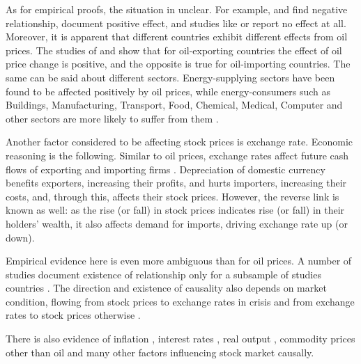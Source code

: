 \documentclass{elsarticle}
\begin{document}
As for empirical proofs, the situation in unclear.
For example, \citet{basher_oil_2012} and \citet{filis_macro_2010} find negative relationship, \citet{narayan_modelling_2010} document positive effect, and studies like \citet{silvapulle_nonparametric_2017} or \citet{zhu_modelling_2014} report no effect at all.
Moreover, it is apparent that different countries exhibit different effects from oil prices. The studies of \citet{mohanty_oil_2011} and \citet{wang_oil_2013} show that for oil-exporting countries the effect of oil price change is positive, and the opposite is true for oil-importing countries.
The same can be said about different sectors. Energy-supplying sectors have been found to be affected positively by oil prices, while energy-consumers such as Buildings, Manufacturing, Transport, Food, Chemical, Medical, Computer and other sectors are more likely to suffer from them \citep{narayan_new_2011, elyasiani_oil_2011}.

Another factor considered to be affecting stock prices is exchange rate. Economic reasoning is the following. Similar to oil prices, exchange rates affect future cash flows of exporting and importing firms \citep{bahmani-oskooee_relation_2015}. Depreciation of domestic currency benefits exporters, increasing their profits, and hurts importers, increasing their costs, and, through this, affects their stock prices. However, the reverse link is known as well: as the rise (or fall) in stock prices indicates rise (or fall) in their holders' wealth, it also affects demand for imports, driving exchange rate up (or down).

Empirical evidence here is even more ambiguous than for oil prices.
A number of studies document existence of relationship only for a subsample of studies countries \citep[][among many others]{inci_dynamic_2014, chen_untangling_2012}.
The direction and existence of causality also depends on market condition, flowing from  stock prices to exchange rates in crisis and from exchange rates to stock prices otherwise \citep{kollias_nexus_2012, tsagkanos_long-run_2013}.

There is also evidence of inflation \citep{anari_stock_2001, eldomiaty_associations_2019}, interest rates \citep{hashemzadeh_stock_1988}, real output \citep{durai_stock_2009, zhao_stock_1999}, commodity prices other than oil \citep{raza_asymmetric_2016, sadorsky_modeling_2014} and many other factors influencing stock market causally.
\end{document}
